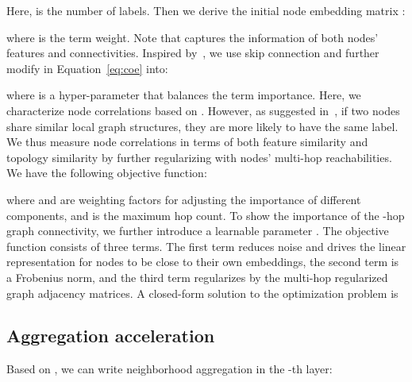 \documentclass[nohyperref]{article}
\theoremstyle{plain}
\theoremstyle{definition}
\theoremstyle{remark}
\begin{document}
Here,  is the number of labels.
Then
we derive the initial node embedding matrix :

where  is the term weight.
Note that  captures the information of both nodes' features and connectivities. 
Inspired by~\cite{klicpera2018predict},
we use skip connection 
and further modify  in Equation~\ref{eq:coe} into:

where  is a hyper-parameter that balances the term importance.
Here,
we characterize node correlations based on .
However,
as suggested in~\cite{suresh2021breaking}, if two nodes share similar local graph structures,
they are more likely to have the same label.
We thus measure node correlations in terms of both feature similarity and topology similarity
by further regularizing  with nodes' multi-hop reachabilities.
We have the following objective function:

where  and  are weighting factors for adjusting the importance 
of different components,
and  is the maximum hop count.
To show the importance of the -hop graph connectivity,
we further introduce a
learnable parameter
.
The objective function consists of three terms.
The first term 
reduces noise and
drives the linear representation for nodes to be close to their own embeddings,
the second term is a Frobenius norm, 
and the third term regularizes  by the multi-hop regularized graph adjacency matrices.
A closed-form solution  to the optimization problem is 



\subsection{Aggregation acceleration}
\label{sec:acc}
Based on ,
we can write neighborhood aggregation in the -th layer: 
\end{document}
